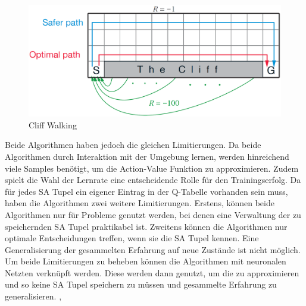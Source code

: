 \begin{figure}[h]
    \centering
    \includegraphics[scale=0.2]{04_Artefakte/01_Abbildungen/rl/rl_cliff_environment.png}
    \caption[Cliff Walking]{Cliff Walking\protect\footnotemark}
    \label{fig:cliffwalking}
\end{figure}

Beide Algorithmen haben jedoch die gleichen Limitierungen. Da beide Algorithmen durch Interaktion mit der Umgebung lernen, werden hinreichend viele Samples benötigt, um die Action-Value Funktion zu approximieren. 
Zudem spielt die Wahl der Lernrate eine entscheidende Rolle für den Trainingserfolg. \cite[S. 131]{kontesg.SeminarReinforcementLearning2021}
Da für jedes \ac{SA Tupel} ein eigener Eintrag in der Q-Tabelle vorhanden sein muss, haben die Algorithmen zwei weitere Limitierungen.
Erstens, können beide Algorithmen nur für Probleme genutzt werden, bei denen eine Verwaltung der zu speichernden \ac{SA Tupel} praktikabel ist.
Zweitens können die Algorithmen nur optimale Entscheidungen treffen, wenn sie die \ac{SA Tupel} kennen. 
Eine Generalisierung der gesammelten Erfahrung auf neue Zustände ist nicht möglich. 
Um beide Limitierungen zu beheben können die Algorithmen mit neuronalen Netzten verknüpft werden.
Diese werden dann genutzt, um die \statevalueFunktion zu approximieren und so keine \ac{SA Tupel} speichern zu müssen und gesammelte Erfahrung zu generalisieren. \cite[S. 195f.]{suttonReinforcementLearningIntroduction2018}, \cite[S. 137ff.]{kontesg.SeminarReinforcementLearning2021}